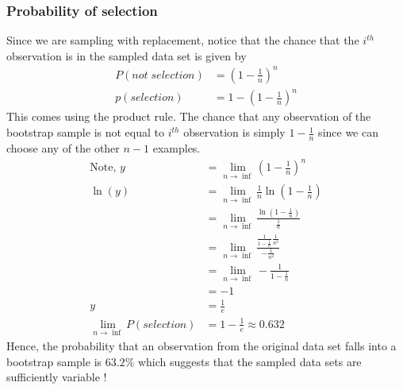\documentclass[11pt, a4paper]{article}
\begin{document}
    \subsubsection{Probability of selection}
    Since we are sampling with replacement, notice that the chance that the $i^{th}$ observation is in the sampled data set is given by
    \begin{align*}
        P(not\;selection) &= (1-\frac{1}{n})^{n}\\
        p(selection) &= 1 - (1 - \frac{1}{n})^{n}
    \end{align*}
    This comes using the product rule. The chance that any observation of the bootstrap sample is not equal to $i^{th}$ observation is simply $1 - \frac{1}{n}$ since we can choose any of the other $n-1$ examples.
    \begin{align*}
        \text{Note, } y &= \lim_{n\to\inf}(1-\frac{1}{n})^{n}\\
                 \ln(y) &= \lim_{n\to\inf}\frac{1}{n}\ln(1-\frac{1}{n}) \\
                        &= \lim_{n\to\inf}\frac{\ln(1-\frac{1}{n})}{\frac{1}{n}} \\
                        &= \lim_{n\to\inf}\frac{\frac{1}{1-\frac{1}{n}} \frac{1}{n^{2}}}{-\frac{1}{n^{2}}} \tag*{Using L'Hospital's Rule}\\
                        &= \lim_{n\to\inf}-\frac{1}{1 - \frac{1}{n}}\\
                        &= -1\\
                      y &= \frac{1}{e}\\
        \lim_{n\to\inf} P(selection) &= 1 - \frac{1}{e} \approx 0.632
    \end{align*}
    Hence, the probability that an observation from the original data set falls into a bootstrap sample is $63.2\%$ which suggests that the sampled data sets are sufficiently variable !
\end{document}
